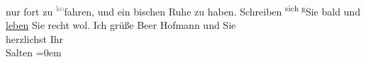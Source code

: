 \begin{ledgroupsized}[t]{13cm}
               nur fort zu \substVorne{}\textsuperscript{\textcolor{gray}{ko}}\substDazwischen{}fa\substHinten{}hren, und ein bischen Ruhe zu haben.\pend
           \pstart
           Schreiben \substVorne{}\textsuperscript{sich g}{\allowbreak}\substDazwischen{}Sie b\substHinten{}ald und \uline{leben} Sie recht wol. Ich grüße Beer Hofmann und Sie {\\[\baselineskip]}herzlichst Ihr {\\[\baselineskip]}\spacefill\mbox{Salten}\pend
           \leftskip=0em{}
         
         \endnumbering{}\end{ledgroupsized}  \newcommand{\dateiname}{L03159}\newcommand{\titel}{Felix Salten an Arthur Schnitzler, 22. 7. 1895}\newcommand{\editorInnen}{Martin Anton Müller und Laura Untner}
      